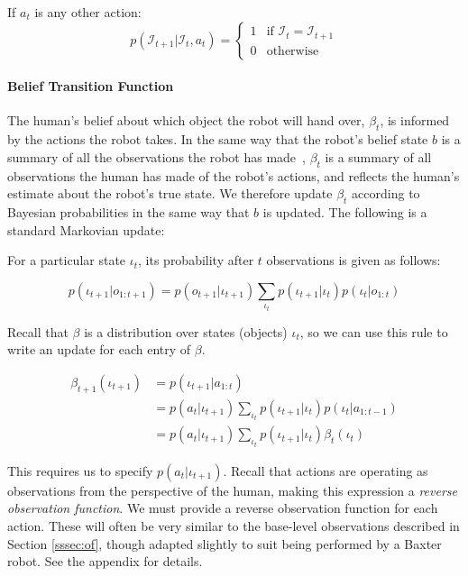 \documentclass[conference]{IEEEtran}
\newcommand{\Iota}{\mathcal{I}}
\begin{document}
If $a_t$ is any other action: 
\begin{equation*}
	p(\Iota_{t+1} | \Iota_t, a_t) = \begin{cases}
		1 & \text{if $\Iota_{t} = \Iota_{t+1}$} \\ 
		0 & \text{otherwise}
	\end{cases}
\end{equation*}

\paragraph{Belief Transition Function}

The human's belief about which object the robot will hand over, $\beta_t$, is informed by the actions the robot takes. In the same way that the robot's belief state $b$ is a summary of all the observations the robot has made~\citep{kaelbling99}, $\beta_t$ is a summary of all observations the human has made of the robot's actions, and reflects the human's estimate about the robot's true state. We therefore update $\beta_t$ according to Bayesian probabilities in the same way that $b$ is updated. The following is a standard Markovian update: 

For a particular state $\iota_t$, its probability after $t$ observations is given as follows: 

\begin{equation*}
	p(\iota_{t+1} | o_{1:t+1}) = p(o_{t+1} | \iota_{t+1}) \sum_{\iota_{t}} p(\iota_{t+1} | \iota_{t}) p (\iota_{t} | o_{1:t})
\end{equation*}

Recall that $\beta$ is a distribution over states (objects) $\iota_t$, so we can use this rule to write an update for each entry of $\beta$. 

\begin{align*}
	\beta_{t+1}(\iota_{t+1})&= p(\iota_{t+1} | a_{1:t})  \\
	&= p(a_{t} | \iota_{t+1}) \sum_{\iota_{t}} p(\iota_{t+1} | \iota_{t}) p (\iota_{t} | a_{1:t-1}) \\ 
	&= p(a_{t} | \iota_{t+1}) \sum_{\iota_{t}} p(\iota_{t+1} | \iota_{t}) \beta_{t}(\iota_{t}) 
\end{align*}

This requires us to specify $p(a_{t} | \iota_{t+1})$. Recall that actions are operating as observations from the perspective of the human, making this expression a \emph{reverse observation function}. We must provide a reverse observation function for each action. These will often be very similar to the base-level observations described in Section \ref{sssec:of}, though adapted slightly to suit being performed by a Baxter robot. See the appendix for details. 
\end{document}
